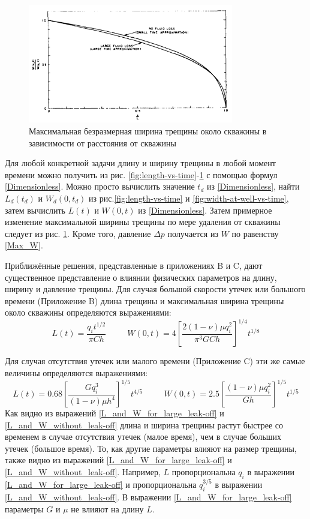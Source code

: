 \documentclass[a4paper, 12pt]{article}
\newcommand{\beq}{\begin{equation}}
\newcommand{\eeq}{\end{equation}}
\begin{document}
\begin{figure}[H]
\center
\includegraphics[width=0.8\textwidth]{maximum_width_vs_distance_from_well}
\caption{Максимальная безразмерная ширина трещины около скважины в зависимости от расстояния от скважины} 
\label{fig:width-vs-distance-from-well}
\end{figure}


Для любой конкретной задачи длину и ширину трещины в любой момент времени можно получить из рис. \ref{fig:length-vs-time}-\ref{fig:width-vs-distance-from-well} с помощью формул \eqref{Dimensionless}.
Можно просто вычислить значение $t_d$ из \eqref{Dimensionless}, найти $L_d(t_d)$ и $W_d(0,t_d)$ из рис.\ref{fig:length-vs-time} и \ref{fig:width-at-well-vs-time}, затем вычислить $L(t)$ и $W(0,t)$ из \eqref{Dimensionless}.
Затем примерное изменение максимальной ширины трещины по мере удаления от скважины следует из рис. \ref{fig:width-vs-distance-from-well}.
Кроме того, давление $\Delta p$ получается из $W$ по равенству \eqref{Max_W}.

Приближённые решения, представленные в приложениях B и C, дают существенное представление о влиянии физических параметров на длину, ширину и давление трещины.
Для случая большой скорости утечек или большого времени (Приложение B) длина трещины и максимальная ширина трещины около скважины определяются выражениями:
\beq\label{L_and_W_for_large_leak-off}
L(t)=\frac{q_i t^{1/2}}{\pi Ch}\,\,\,\,\,\,\,\,\,\,\,\,\,\,\,W(0,t)=4\left[\frac{2(1-\nu)\mu q_i^2}{\pi^3 GCh}\right]^{1/4}t^{1/8}
\eeq

Для случая отсутствия утечек или малого времени (Приложение C) эти же самые величины определяются выражениями:
\beq\label{L_and_W_without_leak-off}
L(t)=0.68\left[\frac{Gq_i^3}{(1-\nu)\mu h^4}\right]^{1/5}t^{4/5}\,\,\,\,\,\,\,\,\,\,\,\,\,\,\,W(0,t)=2.5\left[\frac{(1-\nu)\mu q_i^2}{Gh}\right]^{1/5}t^{1/5}
\eeq
Как видно из выражений \eqref{L_and_W_for_large_leak-off} и \eqref{L_and_W_without_leak-off} длина и ширина трещины растут быстрее со временем в случае отсутствия утечек (малое время), чем в случае больших утечек (большое время).
То, как другие параметры влияют на размер трещины, также видно из выражений \eqref{L_and_W_for_large_leak-off} и \eqref{L_and_W_without_leak-off}.
Например, $L$ пропорциональна $q_i$ в выражении \eqref{L_and_W_for_large_leak-off} и пропорциональна $q_i^{3/5}$ в выражении \eqref{L_and_W_without_leak-off}.
В выражении \eqref{L_and_W_for_large_leak-off} параметры $G$ и $\mu$ не влияют на длину $L$.
\end{document}
